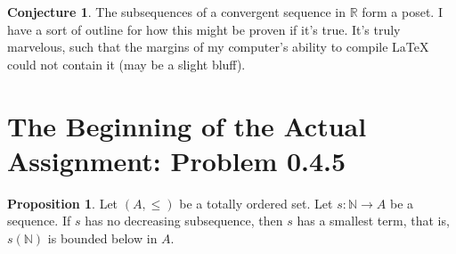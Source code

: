 \documentclass[11pt]{article}
\newcommand{\R}{\mathbb{R}}
\newcommand{\N}{\mathbb{N}}
\theoremstyle{definition}
\newtheorem{proposition}{Proposition}
\newtheorem{conjecture}{Conjecture}
\begin{document}
\begin{conjecture}
The subsequences of a convergent sequence in $\R$ form a poset. I have a sort of outline for how this might be proven if it's true. It's truly marvelous, such that the margins of my computer's ability to compile LaTeX could not contain it (may be a slight bluff).
\end{conjecture}

\section{The Beginning of the Actual Assignment: Problem 0.4.5}

\begin{proposition} Let $(A,\le)$ be a totally ordered set. Let $s:\N\to A$ be a sequence. If $s$ has no decreasing subsequence, then $s$ has a smallest term, that is, $s(\N)$ is bounded below in $A$. 
\end{proposition}
\end{document}
